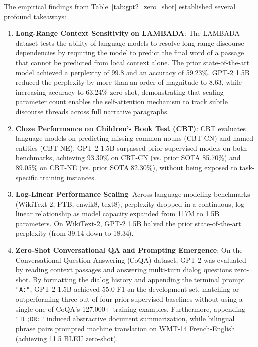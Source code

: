 \documentclass[../../main.tex]{subfiles}
\begin{document}
The empirical findings from Table~\ref{tab:gpt2_zero_shot} established several profound takeaways:
\begin{enumerate}
    \item \textbf{Long-Range Context Sensitivity on LAMBADA}: The LAMBADA dataset tests the ability of language models to resolve long-range discourse dependencies by requiring the model to predict the final word of a passage that cannot be predicted from local context alone. The prior state-of-the-art model achieved a perplexity of 99.8 and an accuracy of 59.23\%. GPT-2 1.5B reduced the perplexity by more than an order of magnitude to 8.63, while increasing accuracy to 63.24\% zero-shot, demonstrating that scaling parameter count enables the self-attention mechanism to track subtle discourse threads across full narrative paragraphs.
    
    \item \textbf{Cloze Performance on Children's Book Test (CBT)}: CBT evaluates language models on predicting missing common nouns (CBT-CN) and named entities (CBT-NE). GPT-2 1.5B surpassed prior supervised models on both benchmarks, achieving 93.30\% on CBT-CN (vs. prior SOTA 85.70\%) and 89.05\% on CBT-NE (vs. prior SOTA 82.30\%), without being exposed to task-specific training instances.
    
    \item \textbf{Log-Linear Performance Scaling}: Across language modeling benchmarks (WikiText-2, PTB, enwik8, text8), perplexity dropped in a continuous, log-linear relationship as model capacity expanded from 117M to 1.5B parameters. On WikiText-2, GPT-2 1.5B halved the prior state-of-the-art perplexity (from 39.14 down to 18.34).
    
    \item \textbf{Zero-Shot Conversational QA and Prompting Emergence}: On the Conversational Question Answering (CoQA) dataset, GPT-2 was evaluated by reading context passages and answering multi-turn dialog questions zero-shot. By formatting the dialog history and appending the terminal prompt \texttt{"A:"}, GPT-2 1.5B achieved 55.0 F1 on the development set, matching or outperforming three out of four prior supervised baselines without using a single one of CoQA's 127,000+ training examples. Furthermore, appending \texttt{"TL;DR:"} induced abstractive document summarization, while bilingual phrase pairs prompted machine translation on WMT-14 French-English (achieving 11.5 BLEU zero-shot).
\end{enumerate}
\end{document}
